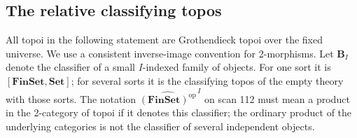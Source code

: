 \subsection{The relative classifying topos}
All topoi in the following statement are Grothendieck topoi over the
fixed universe.  We use a consistent inverse-image convention for
2-morphisms.  Let $\mathbf B_I$ denote the classifier of a small
$I$-indexed family of objects.  For one sort it is
$[\mathbf{FinSet},\mathbf{Set}]$; for several sorts it is the
classifying topos of the empty theory with those sorts.  The notation
$\widehat{(\mathbf{FinSet})^{\mathrm{op}}}^{\,I}$ on scan 112 must
mean a product in the 2-category of topoi if it denotes this
classifier; the ordinary product of the underlying categories is
not the classifier of several independent objects.

